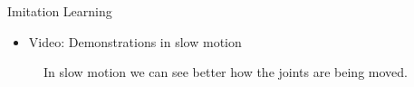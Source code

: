 \documentclass[handout]{beamer}
\begin{document}
%
\begin{frame}{Imitation Learning}
\begin{itemize}
\item Video: Demonstrations in slow motion
\end{itemize}
\begin{figure}[b!]
\centering
{}
\label{Slow teach-in}
\caption{In slow motion we can see better how the joints are being moved.}
\end{figure}
\end{frame}
%
\end{document}
